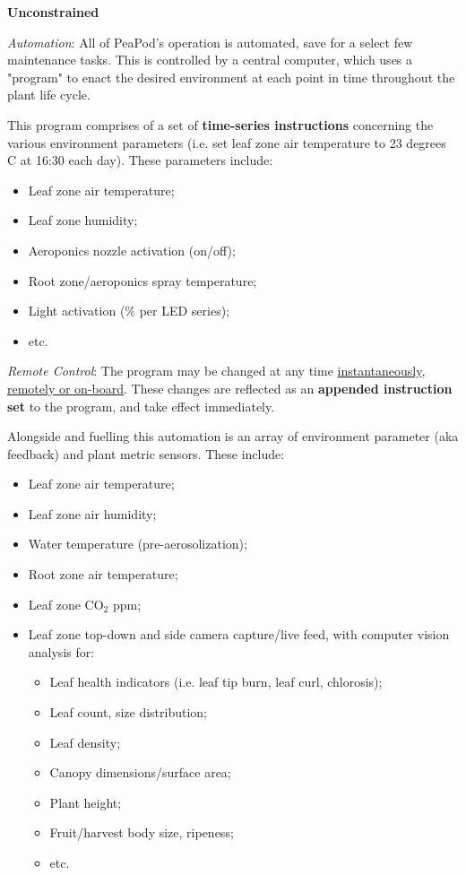 \documentclass{report}
\begin{document}
\textbf{Unconstrained}

\textit{Automation}: All of PeaPod's operation is automated, save for a select few maintenance tasks. This is controlled by a central computer, which uses a "program" to enact the desired environment at each point in time throughout the plant life cycle. 

This program comprises of a set of \textbf{time-series instructions} concerning the various environment parameters (i.e. set leaf zone air temperature to 23 degrees C at 16:30 each day). These parameters include:
\begin{itemize}
    \item Leaf zone air temperature;
    \item Leaf zone humidity;
    \item Aeroponics nozzle activation (on/off);
    \item Root zone/aeroponics spray temperature;
    \item Light activation (\% per LED series);
    \item etc.
\end{itemize}

\textit{Remote Control}: The program may be changed at any time \uline{instantaneously}, \uline{remotely or on-board}. These changes are reflected as an \textbf{appended instruction set} to the program, and take effect immediately. 

Alongside and fuelling this automation is an array of environment parameter (aka feedback) and plant metric sensors. These include:
\begin{itemize}
    \item Leaf zone air temperature;
    \item Leaf zone air humidity;
    \item Water temperature (pre-aerosolization);
    \item Root zone air temperature;
    \item Leaf zone CO${}_2$ ppm;
    \item Leaf zone top-down and side camera capture/live feed, with computer vision analysis for:
    \begin{itemize}
        \item Leaf health indicators (i.e. leaf tip burn, leaf curl, chlorosis);
        \item Leaf count, size distribution;
        \item Leaf density;
        \item Canopy dimensions/surface area;
        \item Plant height;
        \item Fruit/harvest body size, ripeness;
        \item etc.
    \end{itemize}
\end{itemize}
\end{document}
